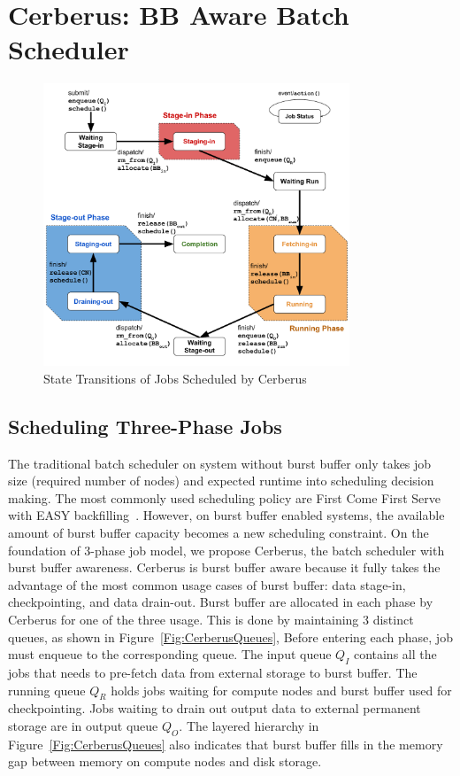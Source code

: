\section{Cerberus: BB Aware Batch Scheduler}
\label{Sec:Scheduler}

\begin{figure}[htp]
\centering
        \includegraphics[width=3.6in]{3PhaseJobFSM}
        \caption{State Transitions of Jobs Scheduled by Cerberus}
\label{Fig:JobFSM}
\end{figure}

\subsection{Scheduling Three-Phase Jobs}

The traditional batch scheduler on system without burst buffer only
takes job size (required number of nodes) and expected runtime into scheduling decision making. 
The most commonly used scheduling policy are First Come First Serve with
EASY backfilling~\cite{tsafrir-tpds-2007}.
However, on burst buffer enabled systems, 
the available amount of burst buffer capacity becomes a new scheduling constraint.
On the foundation of 3-phase job model,
we propose Cerberus, the batch scheduler with burst buffer awareness.
Cerberus is burst buffer aware because it fully takes the advantage of the 
most common usage cases of burst buffer: data stage-in, checkpointing, and data drain-out.
Burst buffer are allocated in each phase by Cerberus for one of the three usage.
This is done by maintaining 3 distinct queues, as shown in Figure~\ref{Fig:CerberusQueues},
Before entering each phase, job must enqueue to the corresponding queue.
The input queue $Q_I$ contains all the jobs that
needs to pre-fetch data from external storage to burst buffer.
The running queue $Q_R$ holds jobs
waiting for compute nodes and burst buffer used for checkpointing.
Jobs waiting to drain out output data to external permanent storage are in output queue $Q_O$.
The layered hierarchy in Figure~\ref{Fig:CerberusQueues} also indicates that
burst buffer fills in the memory gap between memory on compute nodes and disk storage.

